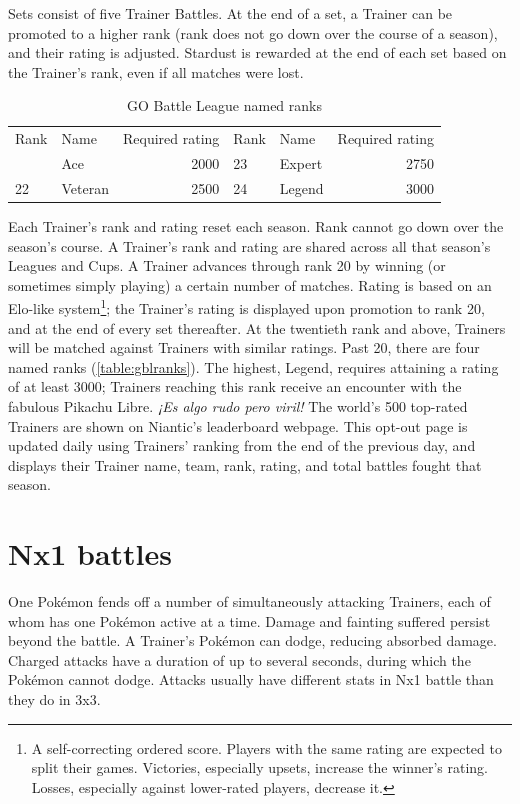Sets consist of five Trainer Battles.
At the end of a set, a Trainer can be promoted to a higher rank (rank does not
 go down over the course of a season), and their rating is adjusted.
Stardust is rewarded at the end of each set based on the Trainer's rank,
 even if all matches were lost.
\begin{table}
\centering
\footnotesize
\begin{tabular}{llr|llr}
Rank & Name & Required rating & Rank & Name & Required rating\\
\Midrule
21 & Ace & 2000     & 23 & Expert & 2750\\
22 & Veteran & 2500 & 24 & Legend & 3000\\
\end{tabular}
\caption{GO Battle League named ranks\label{table:gblranks}}
\end{table}
Each Trainer's rank and rating reset each season.
Rank cannot go down over the season's course.
A Trainer's rank and rating are shared across all that season's Leagues and Cups.
A Trainer advances through rank 20 by winning (or sometimes simply playing) a certain number of matches.
Rating is based on an Elo-like system\footnote{A self-correcting ordered score.
Players with the same rating are expected to split their games.
Victories, especially upsets, increase the winner's rating.
Losses, especially against lower-rated players, decrease it.}; the Trainer's rating is displayed upon promotion to rank 20, and at the end of every set thereafter.
At the twentieth rank and above, Trainers will be matched against Trainers with similar ratings.
Past 20, there are four named ranks (\autoref{table:gblranks}).
The highest, Legend, requires attaining a rating of at least 3000;
 Trainers reaching this rank receive an encounter with the
 fabulous Pikachu Libre. \textit{¡Es algo rudo pero viril!}
The world's 500 top-rated Trainers are shown on Niantic's leaderboard webpage.
This opt-out page is updated daily using Trainers' ranking from the end of the previous day,
 and displays their Trainer name, team, rank, rating, and total battles fought that season.

\section{Nx1 battles\label{sec:nx1}}
One Pokémon fends off a number of simultaneously attacking Trainers, each of whom has one Pokémon active at a time.
Damage and fainting suffered persist beyond the battle.
A Trainer's Pokémon can dodge, reducing absorbed damage.
Charged attacks have a duration of up to several seconds, during which the Pokémon cannot dodge.
Attacks usually have different stats in Nx1 battle than they do in 3x3.


